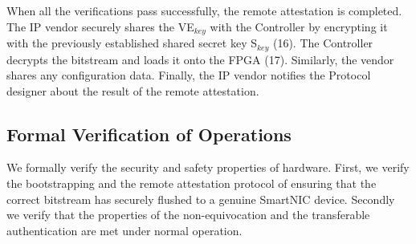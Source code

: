 When all the verifications pass successfully, the remote attestation is completed. The IP vendor securely shares the VE$_{key}$ with the Controller by encrypting it with the previously established shared secret key S$_{key}$ (16).  The Controller decrypts the \projecttitle{} bitstream and loads it onto the FPGA (17). Similarly, the vendor shares any configuration data. Finally, the IP vendor notifies the Protocol designer about the result of the remote attestation.






\subsection{Formal Verification of \projecttitle{} Operations}
\label{subsec::formal_verification_remote_attestation}
We formally verify the security and safety properties of \projecttitle{} hardware. First, we verify the bootstrapping and the remote attestation protocol of \projecttitle{} ensuring that the correct bitstream has securely flushed to a genuine SmartNIC device. Secondly we verify that the properties of the non-equivocation and the transferable authentication are met under normal operation. 

